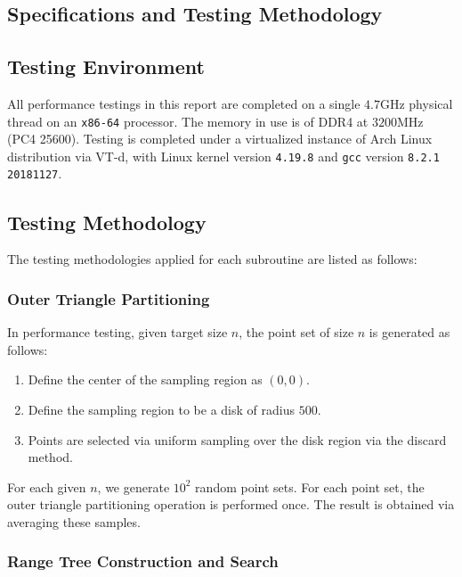 \documentclass{article}
\begin{document}
\begin{appendices}
    \section{Specifications and Testing Methodology} \label{apdx:specifications}

    \subsection{Testing Environment}

    All performance testings in this report are completed on a single $4.7$GHz physical thread on an \texttt{x86-64} processor. The memory in use is of DDR4 at $3200$MHz (PC4 25600). Testing is completed under a virtualized instance of Arch Linux distribution via VT-d, with Linux kernel version \texttt{4.19.8} and \texttt{gcc} version \texttt{8.2.1 20181127}.

    \subsection{Testing Methodology}

    The testing methodologies applied for each subroutine are listed as follows:

    \subsubsection{Outer Triangle Partitioning}

    In performance testing, given target size $n$, the point set of size $n$ is generated as follows:
    \begin{enumerate}
        \item Define the center of the sampling region as $(0, 0)$.
        \item Define the sampling region to be a disk of radius $500$.
        \item Points are selected via uniform sampling over the disk region via the discard method.
    \end{enumerate}
    For each given $n$, we generate $10^2$ random point sets. For each point set, the outer triangle partitioning operation is performed once. The result is obtained via averaging these samples.

    \subsubsection{Range Tree Construction and Search}


\end{appendices}
\end{document}
